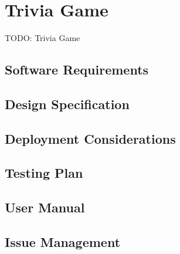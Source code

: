 \section{Trivia Game}

TODO: Trivia Game

\subsection{Software Requirements}

\subsection{Design Specification}

\subsection{Deployment Considerations}

\subsection{Testing Plan}

\subsection{User Manual}

\subsection{Issue Management}
